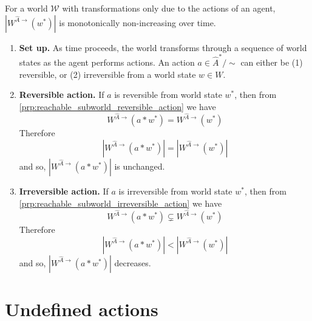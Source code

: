 \begin{propositionE}
    For a world $\mathscr{W}$ with transformations only due to the actions of an agent, $|W^{\hat{A}\to}(w^{*})|$ is monotonically non-increasing over time.
\end{propositionE}
\begin{proofE}
\begin{enumerate}
    \item \textbf{Set up.}
    As time proceeds, the world transforms through a sequence of world states as the agent performs actions.
    An action $a \in \hat{A}^{*}/\sim$ can either be (1) reversible, or (2) irreversible from a world state $w \in W$.
    
    \item \textbf{Reversible action.}
    If $a$ is reversible from world state $w^{*}$, then from \cref{prp:reachable_subworld_reversible_action} we have
    \begin{equation}
        W^{\hat{A}\to}(a \ast w^{*}) = W^{\hat{A}\to}(w^{*})
    \end{equation}
    Therefore
    \begin{equation}
        |W^{\hat{A}\to}(a \ast w^{*})| = |W^{\hat{A}\to}(w^{*})|
    \end{equation}
    and so, $|W^{\hat{A}\to}(a \ast w^{*})|$ is unchanged.

    \item \textbf{Irreversible action.}
    If $a$ is irreversible from world state $w^{*}$, then from \cref{prp:reachable_subworld_irreversible_action} we have
    \begin{equation}
        W^{\hat{A}\to}(a \ast w^{*}) \subsetneq W^{\hat{A}\to}(w^{*})
    \end{equation}
    Therefore
    \begin{equation}
        |W^{\hat{A}\to}(a \ast w^{*})| < |W^{\hat{A}\to}(w^{*})|
    \end{equation}
    and so, $|W^{\hat{A}\to}(a \ast w^{*})|$ decreases.
\end{enumerate}
\end{proofE}





\section{
Undefined actions
}\label{sec:Undefined actions}

